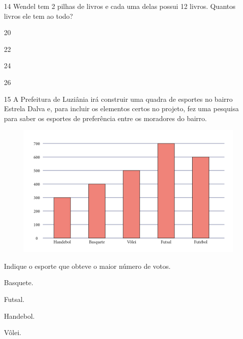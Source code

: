 \num{14} Wendel tem 2 pilhas de livros e cada uma delas possui 12 livros. Quantos livros ele tem ao todo?


\begin{escolha}[itemsep=-5pt]
\item 20

\item 22

\item 24

\item 26
\end{escolha}

\num{15} A Prefeitura de Luziânia irá construir uma quadra de esportes no bairro
Estrela Dalva e, para incluir os elementos certos no projeto, fez uma
pesquisa para saber os esportes de preferência entre os moradores
do bairro.

\begin{figure}[H]
\centering
\includegraphics[width=.9\textwidth]{./media/image122.png}
\end{figure}

Indique o esporte que obteve o maior número de votos.

\begin{escolha}[itemsep=-5pt]
\item Basquete.

\item Futsal.

\item Handebol.

\item Vôlei.
\end{escolha}

